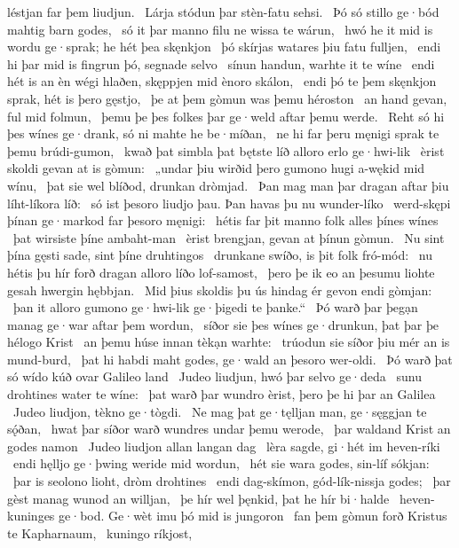 léstjan far þem liudjun. \hld\ Lárja stódun þar
stèn-fatu sehsi. \hld\ Þó só stillo ge·bód
mahtig barn godes, \hld\ só it þar manno filu
ne wissa te wárun, \hld\ hwó he it mid is wordu ge·sprak;
he hét þea skęnkjon \hld\ þó skírjas watares
þiu fatu fulljen, \hld\ endi hi þar mid is fingrun þó,
segnade selvo \hld\ sínun handun,
warhte it te wíne \hld\ endi hét is an èn wégi hlaðen,
skęppjen mid ènoro skálon, \hld\ endi þó te þem skęnkjon sprak,
hét is þero gęstjo, \hld\ þe at þem gòmun was
þemu héroston \hld\ an hand gevan,
ful mid folmun, \hld\ þemu þe þes folkes þar
ge·weld aftar þemu werde. \hld\ Reht só hi þes wínes ge·drank,
só ni mahte he be·míðan, \hld\ ne hi far þeru męnigi sprak
te þemu brúdi-gumon, \hld\ kwað þat simbla þat bętste líð
alloro erlo ge·hwi-lik \hld\ èrist skoldi
gevan at is gòmun: \hld\ „undar þiu wirðid þero gumono hugi
a-wękid mid wínu, \hld\ þat sie wel blíðod,
drunkan dròmjad. \hld\ Þan mag man þar dragan aftar þiu
líht-líkora líð: \hld\ só ist þesoro liudjo þau.
Þan havas þu nu wunder-líko \hld\ werd-skępi þínan
ge·markod far þesoro męnigi: \hld\ hétis far þit manno folk
alles þínes wínes \hld\ þat wirsiste
þíne ambaht-man \hld\ èrist brengjan,
gevan at þínun gòmun. \hld\ Nu sint þína gęsti sade,
sint þíne druhtingos \hld\ drunkane swíðo,
is þit folk fró-mód: \hld\ nu hétis þu hír forð dragan
alloro líðo lof-samost, \hld\ þero þe ik eo an þesumu liohte gesah
hwergin hębbjan. \hld\ Mid þius skoldis þu ús hindag ér
gevon endi gòmjan: \hld\ þan it alloro gumono ge·hwi-lik
ge·þigedi te þanke.“ \hld\ Þó warð þar þegạn manag
ge·war aftar þem wordun, \hld\ síðor sie þes wínes ge·drunkun,
þat þar þe hélogo Krist \hld\ an þemu húse innan
tèkạn warhte: \hld\ trúodun sie síðor
þiu mér an is mund-burd, \hld\ þat hi habdi maht godes,
ge·wald an þesoro wer-oldi. \hld\ Þó warð þat só wído kúð
ovar Galileo land \hld\ Judeo liudjun,
hwó þar selvo ge·deda \hld\ sunu drohtines
water te wíne: \hld\ þat warð þar wundro èrist,
þero þe hi þar an Galilea \hld\ Judeo liudjon,
tèkno ge·tògdi. \hld\ Ne mag þat ge·tęlljan man,
ge·sęggjan te sǫ́ðan, \hld\ hwat þar síðor warð
wundres undar þemu werode, \hld\ þar waldand Krist
an godes namon \hld\ Judeo liudjon
allan langan dag \hld\ lèra sagde,
gi·hét im heven-ríki \hld\ endi hęlljo ge·þwing
weride mid wordun, \hld\ hét sie wara godes,
sin-líf sókjan: \hld\ þar is seolono lioht,
dròm drohtines \hld\ endi dag-skímon,
gód-lík-nissja godes; \hld\ þar gèst manag
wunod an willjan, \hld\ þe hír wel þęnkid,
þat he hír bi·halde \hld\ heven-kuninges ge·bod.
Ge·wèt imu þó mid is jungoron \hld\ fan þem gòmun forð
Kristus te Kapharnaum, \hld\ kuningo ríkjost,
